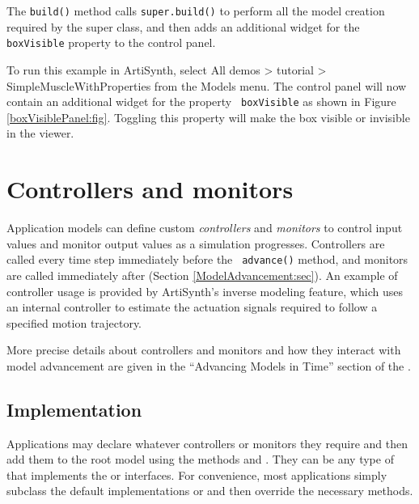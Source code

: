 The {\tt build()} method calls {\tt super.build()} to perform all the
model creation required by the super class, and then adds an
additional widget for the {\tt boxVisible} property to the control
panel.

To run this example in ArtiSynth, select {\sf All demos > tutorial >
SimpleMuscleWithProperties} from the {\sf Models} menu. The control
panel will now contain an additional widget for the property {\tt
boxVisible} as shown in Figure \ref{boxVisiblePanel:fig}. Toggling
this property will make the box visible or invisible in the viewer.





\section{Controllers and monitors}
\label{ControllersAndMonitors:sec}

Application models can define custom {\it controllers} and {\it monitors} to
control input values and monitor output values as a simulation
progresses. Controllers are called every time step immediately before the {\tt
advance()} method, and monitors are called immediately after
(Section \ref{ModelAdvancement:sec}).  An example of controller usage is
provided by ArtiSynth's inverse modeling feature, which uses an internal
controller to estimate the actuation signals required to follow a specified
motion trajectory.

More precise details about controllers and monitors and how they
interact with model advancement are given in the
``Advancing Models in Time'' section of the
.

\subsection{Implementation}
\label{ControllerImplementation:sec}

Applications may declare whatever controllers or monitors they require and then
add them to the root model using the methods
 and
.
They can be any type of
 that implements
the  or
 interfaces.  For
convenience, most applications simply subclass
the default implementations
 or
 and then override
the necessary methods.

